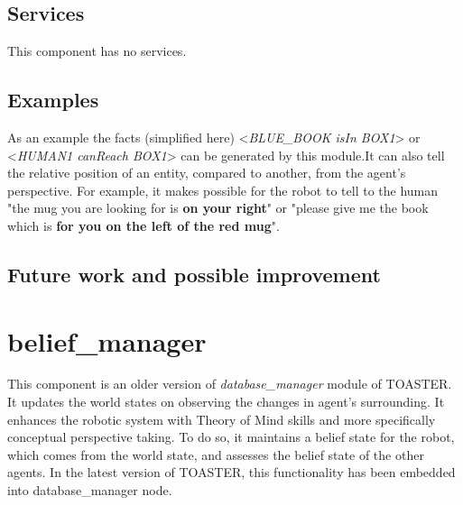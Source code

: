 \documentclass[a4paper]{article}
\begin{document}
\subsection{Services}
This component has no services.
\subsection{Examples}
 As an example the facts (simplified here) <\textit{BLUE\_BOOK isIn BOX1}> or <\textit{HUMAN1 canReach BOX1}> can be generated by this module.It can also tell the relative position of an entity, compared to another, from the agent's perspective. For example, it makes possible for the robot to tell to the human "the mug you are looking for is \textbf{on your right}" or "please give me the book which is \textbf{for you on the left of the red mug}".
\subsection{Future work and possible improvement}

\section{belief\_manager}
This component is an older version of \textit{database\_manager} module of TOASTER. It updates the world states on observing the changes in agent's surrounding. It enhances the robotic system with Theory of Mind skills and more specifically conceptual perspective taking. To do so, it maintains a belief state for the robot, which comes from the world state, and assesses the belief state of the other agents.
In the latest version of TOASTER, this functionality has been embedded into database\_manager node.
\end{document}
